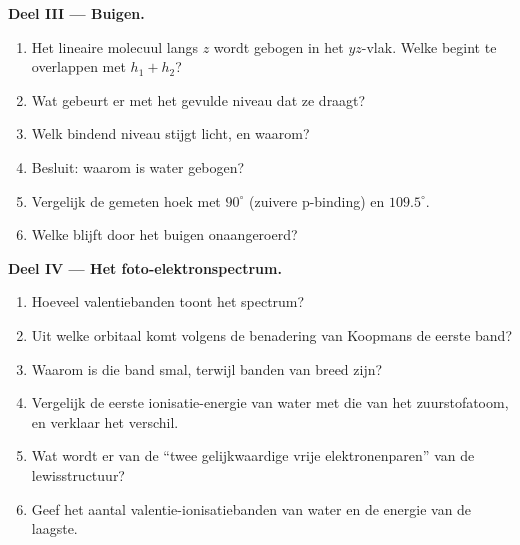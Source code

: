 \begin{problem}
\medskip
\noindent\textbf{Deel III --- Buigen.}
\begin{enumerate}[resume]
  \item Het lineaire molecuul langs $z$ wordt gebogen in het $yz$-vlak. Welke
         begint te overlappen met $h_1 + h_2$?
  \item Wat gebeurt er met het gevulde niveau dat ze draagt?
  \item Welk bindend niveau stijgt licht, en waarom?
  \item Besluit: waarom is water gebogen?
  \item Vergelijk de gemeten hoek met $90^\circ$ (zuivere p-binding) en $109.5^\circ$.
  \item Welke  blijft door het buigen onaangeroerd?
\end{enumerate}

\medskip
\noindent\textbf{Deel IV --- Het foto-elektronspectrum.}
\begin{enumerate}[resume]
  \item Hoeveel valentiebanden toont het spectrum?
  \item Uit welke orbitaal komt volgens de benadering van Koopmans de eerste band?
  \item Waarom is die band smal, terwijl banden van  breed zijn?
  \item Vergelijk de eerste ionisatie-energie van water met die van het zuurstofatoom,
        en verklaar het verschil.
  \item Wat wordt er van de ``twee gelijkwaardige vrije elektronenparen'' van de lewisstructuur?
  \item Geef het aantal valentie-ionisatiebanden van water en de energie van
        de laagste.
\end{enumerate}
\end{problem}
